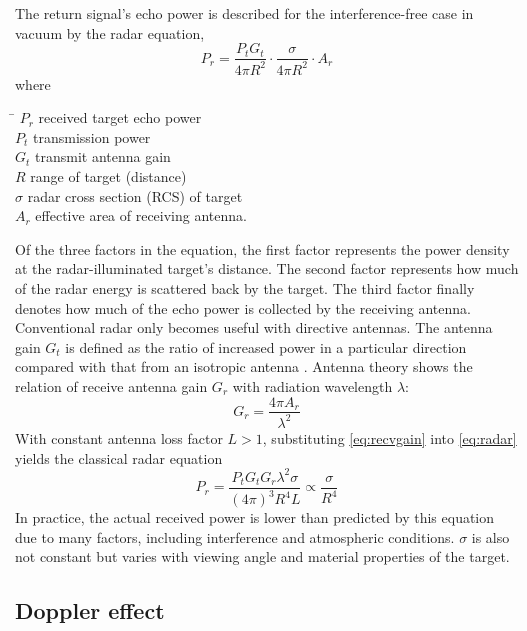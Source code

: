 The return signal's echo power is described for the interference-free
case in vacuum by the radar equation,
\begin{equation} \label{eq:radar}
    P_r =  \frac{P_t G_t}{4\pi R^2} \cdot \frac{\sigma}{4\pi R^2} \cdot A_r
\end{equation}
where
\begin{tabbing}
\hspace{1cm} \= \kill
$P_r$ \> received target echo power \\
$P_t$ \> transmission power \\
$G_t$ \> transmit antenna gain \\
$R$ \> range of target (distance) \\
$\sigma$ \> radar cross section (RCS) of target \\
$A_r$ \> effective area of receiving antenna.
\end{tabbing}
Of the three factors in the equation, the first
factor represents the power density at the radar-illuminated target's
distance. The second factor represents how much of the radar energy is
scattered back by the target. The third factor finally denotes how much
of the echo power is collected by the receiving antenna.
\cite{Skolnik2008} Conventional radar only becomes useful with directive
antennas. The antenna gain \(G_t\) is defined as the ratio of increased
power in a particular direction compared with that from an isotropic
antenna \cite{Adams2012}. Antenna theory shows \cite{Balanis2015} the
relation of receive antenna gain \(G_r\) with radiation wavelength
\(\lambda\):
\begin{equation} \label{eq:recvgain}
    G_r = \frac{4\pi A_r}{\lambda^2}    
\end{equation}
With constant antenna loss factor \(L>1\), substituting \cref{eq:recvgain} into \cref{eq:radar}
yields the classical radar equation
\begin{equation} \label{eq:radarclassical}
    P_r =
    \frac{P_t G_t G_r \lambda^2 \sigma}{(4\pi)^3R^4L}
    \propto \frac{\sigma}{R^4}
\end{equation}
In practice, the actual received power is lower than predicted by
this equation due to many factors, including interference and
atmospheric conditions. \(\sigma\) is also not constant but varies with
viewing angle and material properties of the target. \cite{Adams2012}

\subsection{Doppler effect}\label{doppler-effect}

